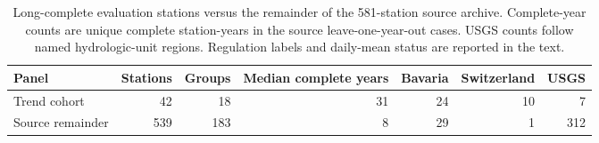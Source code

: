\begin{table}[t]\centering\small
\caption{Long-complete evaluation stations versus the remainder of the 581-station source archive. Complete-year counts are unique complete station-years in the source leave-one-year-out cases. USGS counts follow named hydrologic-unit regions. Regulation labels and daily-mean status are reported in the text.}
\label{tab:archive-comparison}
\begin{tabular}{lrrrrrr}
\toprule
Panel & Stations & Groups & Median complete years & Bavaria & Switzerland & USGS \\
\midrule
Trend cohort & 42 & 18 & 31 & 24 & 10 & 7 \\
Source remainder & 539 & 183 & 8 & 29 & 1 & 312 \\
\bottomrule\end{tabular}
\end{table}
